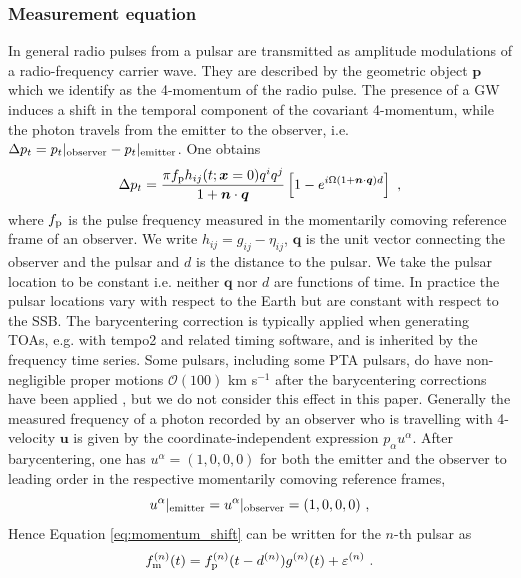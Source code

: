 \documentclass[fleqn,usenatbib,useAMS]{mnras}
\begin{document}
\subsubsection{Measurement equation}
In general radio pulses from a pulsar are transmitted as amplitude modulations of a radio-frequency carrier wave. They are described by the geometric object $\boldsymbol{p}$ which we identify  as the 4-momentum of the radio pulse. The presence of a GW induces a shift in the temporal component of the covariant 4-momentum, while the photon travels from the emitter to the observer, i.e. $\Delta p_t = p_t|_{\rm observer} - p_t|_{\rm emitter} $. One obtains \citep[e.g.][]{Maggiore}
\begin{equation}
 \Delta p_t =  \frac{\pi f_{\rm p} h_{ij} (t; \boldsymbol{x}= 0)q^i q^j }{1 + \boldsymbol{n}\cdot \boldsymbol{q} }  \left[1 -e^{i \Omega (1 + \boldsymbol{n}\cdot \boldsymbol{q})  d}\right] \ ,
	\label{eq:momentum_shift}
\end{equation}
where $f_{\rm p}$ is the pulse frequency measured in the momentarily comoving reference frame of an observer. We write $h_{ij} = g_{ij} - \eta_{ij}$, $\boldsymbol{q}$ is the unit vector connecting the observer and the pulsar and $d$ is the distance to the pulsar. We take the pulsar location to be constant i.e.  neither $\boldsymbol{q}$ nor $d$ are functions of time. In practice the pulsar locations vary with respect to the Earth but are constant with respect to the SSB. The barycentering correction is typically applied when generating TOAs, e.g. with {\sc tempo2} \citep{tempo2} and related timing software, and is inherited by the frequency time series. Some pulsars, including some PTA pulsars, do have non-negligible proper motions $\mathcal{O} (100)$ km s$^{-1}$ after the barycentering corrections have been applied \citep[e.g.][]{10.1093/mnras/sty3390}, but we do not consider this effect in this paper. Generally the measured frequency of a photon recorded by an observer who is travelling with 4-velocity $\boldsymbol{u}$ is given by the coordinate-independent expression $p_{\alpha} u^{\alpha}$. After barycentering, one has $u^{\alpha} =(1,0,0,0)$ for both the emitter and the observer to leading order in the respective momentarily comoving reference frames,
\begin{equation}
	u^{\alpha}|_{\rm emitter} = u^{\alpha}|_{\rm observer} = (1,0,0,0) \ ,
\end{equation}
Hence Equation \eqref{eq:momentum_shift} can be written for the $n$-th pulsar as
\begin{equation}
	f_{\rm m}^{(n)}(t) = f_{\rm p}^{(n)}(t-d^{(n)}) g^{(n)}(t) +  \varepsilon^{(n)}\ .
	\label{eq:measurement}
\end{equation}
\end{document}
